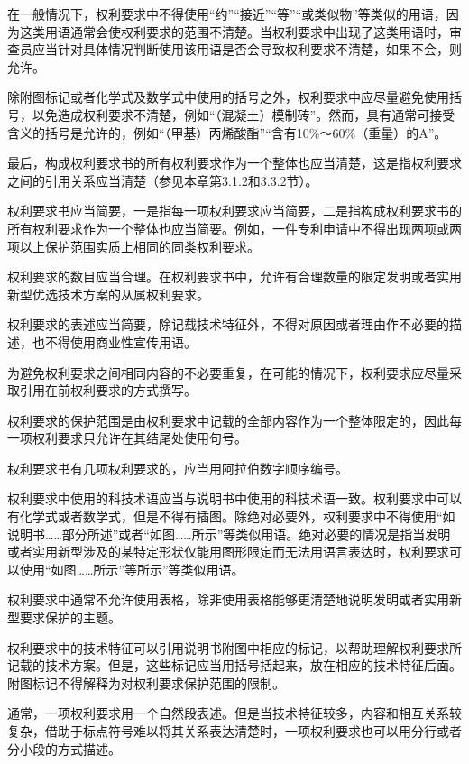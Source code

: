 在一般情况下，权利要求中不得使用“约”“接近”“等”“或类似物”等类似的用语，因为这类用语通常会使权利要求的范围不清楚。当权利要求中出现了这类用语时，审查员应当针对具体情况判断使用该用语是否会导致权利要求不清楚，如果不会，则允许。

除附图标记或者化学式及数学式中使用的括号之外，权利要求中应尽量避免使用括号，以免造成权利要求不清楚，例如“（混凝土）模制砖”。然而，具有通常可接受含义的括号是允许的，例如“（甲基）丙烯酸酯”“含有10\%～60\%（重量）的A”。

最后，构成权利要求书的所有权利要求作为一个整体也应当清楚，这是指权利要求之间的引用关系应当清楚（参见本章第3.1.2和3.3.2节）。

权利要求书应当简要，一是指每一项权利要求应当简要，二是指构成权利要求书的所有权利要求作为一个整体也应当简要。例如，一件专利申请中不得出现两项或两项以上保护范围实质上相同的同类权利要求。

权利要求的数目应当合理。在权利要求书中，允许有合理数量的限定发明或者实用新型优选技术方案的从属权利要求。

权利要求的表述应当简要，除记载技术特征外，不得对原因或者理由作不必要的描述，也不得使用商业性宣传用语。

为避免权利要求之间相同内容的不必要重复，在可能的情况下，权利要求应尽量采取引用在前权利要求的方式撰写。

权利要求的保护范围是由权利要求中记载的全部内容作为一个整体限定的，因此每一项权利要求只允许在其结尾处使用句号。

权利要求书有几项权利要求的，应当用阿拉伯数字顺序编号。

权利要求中使用的科技术语应当与说明书中使用的科技术语一致。权利要求中可以有化学式或者数学式，但是不得有插图。除绝对必要外，权利要求中不得使用“如说明书……部分所述”或者“如图……所示”等类似用语。绝对必要的情况是指当发明或者实用新型涉及的某特定形状仅能用图形限定而无法用语言表达时，权利要求可以使用“如图……所示”等所示”等类似用语。

权利要求中通常不允许使用表格，除非使用表格能够更清楚地说明发明或者实用新型要求保护的主题。

权利要求中的技术特征可以引用说明书附图中相应的标记，以帮助理解权利要求所记载的技术方案。但是，这些标记应当用括号括起来，放在相应的技术特征后面。附图标记不得解释为对权利要求保护范围的限制。

通常，一项权利要求用一个自然段表述。但是当技术特征较多，内容和相互关系较复杂，借助于标点符号难以将其关系表达清楚时，一项权利要求也可以用分行或者分小段的方式描述。

